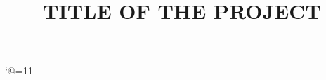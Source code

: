 \bgroup
\catcode`@=11
\gdef\getfontsize{\f@size pt}
\egroup
\newcommand{\normal}{\fontsize{12pt}{16pt}\selectfont}
\newcommand{\size}{\fontsize{14pt}{18pt}\selectfont}
\newcommand{\bigsize}{\fontsize{16pt}{20pt}\selectfont}
\newcommand{\bigbigsize}{\fontsize{20pt}{24pt}\selectfont}
\title{\bigbigsize \textbf{TITLE OF THE PROJECT}}




\thispagestyle{empty}
\maketitle
\restoregeometry
\newpage
